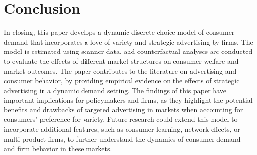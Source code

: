 \documentclass[12pt]{article}
\begin{document}
\section{Conclusion}

In closing, this paper develops a dynamic discrete choice model of consumer demand that incorporates a love of variety and strategic advertising by firms. The model is estimated using scanner data, and counterfactual analyses are conducted to evaluate the effects of different market structures on consumer welfare and market outcomes. The paper contributes to the literature on  advertising and consumer behavior, by providing empirical evidence on the effects of strategic advertising in a dynamic demand setting. The findings of this paper have important implications for policymakers and firms, as they highlight the potential benefits and drawbacks of targeted advertising in markets when accounting for consumers' preference for variety. Future research could extend this model to incorporate additional features, such as consumer learning, network effects, or multi-product firms, to further understand the dynamics of consumer demand and firm behavior in these markets.

\newpage


\end{document}
